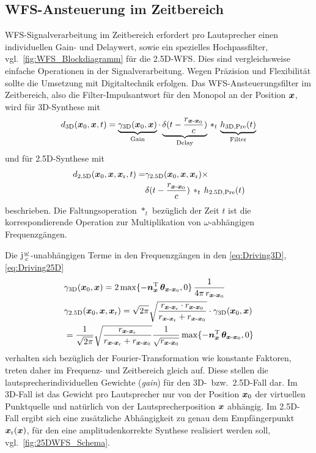 \subsection{WFS-Ansteuerung im Zeitbereich}
\label{sec:WFS_Ansteuerung_im_Zeitbereich}
%
WFS-Signalverarbeitung im Zeitbereich erfordert pro Lautsprecher
einen individuellen Gain- und Delaywert, sowie ein spezielles Hochpassfilter,
vgl.~\Abb\ref{fig:WFS_Blockdiagramm} für die 2.5D-WFS.
%
Dies sind vergleichsweise einfache Operationen in der Signalverarbeitung.
%
Wegen Präzision und Flexibilität sollte die Umsetzung mit Digitaltechnik
erfolgen.
%
Das WFS-Ansteuerungsfilter im Zeitbereich, also die
Filter-Impulsantwort für den Monopol an der
Position $\bm{x}$, wird für 3D-Synthese mit
\begin{align}
d_\text{3D}(\bm{x}_\mathrm{0},\bm{x}, t) =
\underbrace{\gamma_\text{3D}(\bm{x}_\mathrm{0},\bm{x})}_{\text{Gain}} \cdot
\underbrace{\delta(t-\frac{r_{\bm{x}\text{-}\bm{x}_\mathrm{0}}}{c})}_{\text{Delay}} \,\ast_t\,
\underbrace{h_\text{3D,Pre}(t)}_{\text{Filter}}
\end{align}
und für 2.5D-Synthese mit
\begin{align}
d_\text{2.5D}(\bm{x}_\mathrm{0},\bm{x},\bm{x}_\mathrm{r}, t) =
&\gamma_\text{2.5D}(\bm{x}_\mathrm{0},\bm{x},\bm{x}_\mathrm{r}) \times\nonumber\\
&\delta(t-\frac{r_{\bm{x}\text{-}\bm{x}_\mathrm{0}}}{c}) \,\ast_t\,
h_\text{2.5D,Pre}(t)
\label{eq:h25d_time}
\end{align}
beschrieben.
%
Die Faltungsoperation $\ast_t$ bezüglich der Zeit $t$ ist die
korrespondierende Operation zur Multiplikation von $\omega$-abhängigen
Frequenzgängen.



Die $\im\frac{\omega}{c}$-unabhängigen Terme in den Frequenzgängen
in den \Glgn\eqref{eq:Driving3D}, \eqref{eq:Driving25D}
%
\begin{align}
&\gain_\text{3D}(\xp,\xs) = 2 \, \mathrm{max}\{-\nxT \, \bm{\theta}_{\xs\text{-}\xp}, 0\} \, \frac{1}{4\pi \, r_{\xs\text{-}\xp}}\\
%
&\gain_\text{2.5D}(\xp,\xs,\xr) =
\sqrt{2\pi}
\sqrt{\frac{r_{\xs\text{-}\xr} \cdot r_{\xs\text{-}\xp}}{r_{\xs\text{-}\xr} + r_{\xs\text{-}\xp}}}
\cdot \gain_\text{3D}(\xp,\xs)\nonumber\\
&={\frac{1}{\sqrt{2\pi}}}
\sqrt{\frac{r_{\xs\text{-}\xr}}{r_{\xs\text{-}\xr} + r_{\xs\text{-}\xp}}} \frac{1}{\sqrt{r_{\xs\text{-}\xp}}}
\,\mathrm{max}\{-\nxT \, \bm{\theta}_{\xs\text{-}\xp}, 0\}
\end{align}
%
verhalten sich bezüglich der Fourier-Transformation wie konstante Faktoren, treten
daher im Frequenz- und Zeitbereich gleich auf.
%
Diese stellen die lautsprecherindividuellen Gewichte (\textit{gain}) für den
3D-~bzw.~2.5D-Fall dar.
%
Im 3D-Fall ist das Gewicht pro Lautsprecher nur von der Position $\bm{x}_\mathrm{0}$  der
virtuellen Punktquelle und natürlich von der Lautsprecherposition $\bm{x}$ abhängig.
%
Im 2.5D-Fall ergibt sich eine zusätzliche Abhängigkeit zu genau dem Empfängerpunkt
$\bm{x}_\mathrm{r}(\bm{x})$, für den eine amplitudenkorrekte Synthese realisiert werden soll,
vgl.~\Abb\ref{fig:25DWFS_Schema}.



